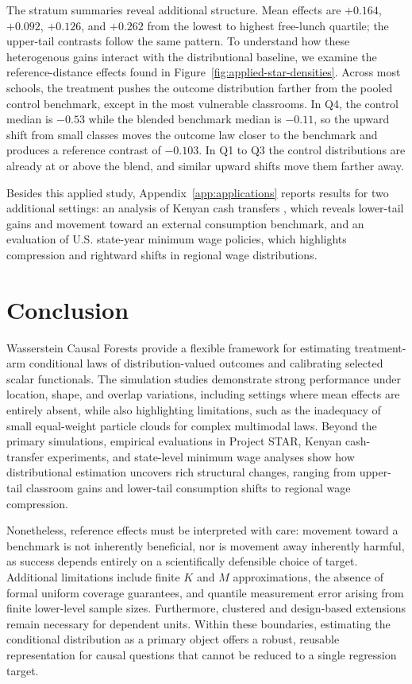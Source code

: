 \documentclass[twoside]{article}
\begin{document}
The stratum summaries reveal additional structure. Mean effects are $+0.164$, $+0.092$, $+0.126$, and $+0.262$ from the lowest to highest free-lunch quartile; the upper-tail contrasts follow the same pattern. To understand how these heterogenous gains interact with the distributional baseline, we examine the reference-distance effects found in Figure~\ref{fig:applied-star-densities}. Across most schools, the treatment pushes the outcome distribution farther from the pooled control benchmark, except in the most vulnerable classrooms. In Q4, the control median is $-0.53$ while the blended benchmark median is $-0.11$, so the upward shift from small classes moves the outcome law closer to the benchmark and produces a reference contrast of $-0.103$. In Q1 to Q3 the control distributions are already at or above the blend, and similar upward shifts move them farther away. 

Besides this applied study, Appendix~\ref{app:applications} reports results for two additional settings: an analysis of Kenyan cash transfers \citep{egger2022general,egger2024replication}, which reveals lower-tail gains and movement toward an external consumption benchmark, and an evaluation of U.S. state-year minimum wage policies, which highlights compression and rightward shifts in regional wage distributions.

\clearpage
\section{Conclusion}\label{sec:conclusion}

Wasserstein Causal Forests provide a flexible framework for estimating treatment-arm conditional laws of distribution-valued outcomes and calibrating selected scalar functionals. The simulation studies demonstrate strong performance under location, shape, and overlap variations, including settings where mean effects are entirely absent, while also highlighting limitations, such as the inadequacy of small equal-weight particle clouds for complex multimodal laws. Beyond the primary simulations, empirical evaluations in Project STAR, Kenyan cash-transfer experiments, and state-level minimum wage analyses show how distributional estimation uncovers rich structural changes, ranging from upper-tail classroom gains and lower-tail consumption shifts to regional wage compression.

Nonetheless, reference effects must be interpreted with care: movement toward a benchmark is not inherently beneficial, nor is movement away inherently harmful, as success depends entirely on a scientifically defensible choice of target. Additional limitations include finite $K$ and $M$ approximations, the absence of formal uniform coverage guarantees, and quantile measurement error arising from finite lower-level sample sizes. Furthermore, clustered and design-based extensions remain necessary for dependent units. Within these boundaries, estimating the conditional distribution as a primary object offers a robust, reusable representation for causal questions that cannot be reduced to a single regression target.
\end{document}
